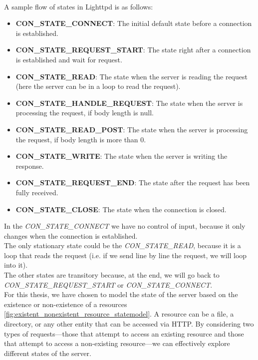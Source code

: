 \\A sample flow of states in Lighttpd is as follows:
\begin{itemize}
    \item \textbf{CON\_STATE\_CONNECT}: The initial default state before a connection is established.
    
    \item \textbf{CON\_STATE\_REQUEST\_START}: The state right after a connection is established and wait for request.
    
    \item \textbf{CON\_STATE\_READ}: The state when the server is reading the request (here the server can be in a loop to read the request).
    
    \item \textbf{CON\_STATE\_HANDLE\_REQUEST}: The state when the server is processing the request, if body length is null.
    
    \item \textbf{CON\_STATE\_READ\_POST}: The state when the server is processing the request, if body length is more than 0.
    
    \item \textbf{CON\_STATE\_WRITE}: The state when the server is writing the response.
    
    \item \textbf{CON\_STATE\_REQUEST\_END}: The state after the request has been fully received.
    
    \item \textbf{CON\_STATE\_CLOSE}: The state when the connection is closed.
\end{itemize}
In the \textit{CON\_STATE\_CONNECT} we have no control of input, because it only changes when the connection is established.
\\The only stationary state could be the \textit{CON\_STATE\_READ}, because it is a loop that reads the request (i.e. if we send line by line the request, we will loop into it).
\\The other states are transitory because, at the end, we will go back to \textit{CON\_STATE\_REQUEST\_START} or \textit{CON\_STATE\_CONNECT}.
\\For this thesis, we have chosen to model the state of the server based on the existence or non-existence of a resources \ref{fig:existent_nonexistent_resource_statemodel}. A resource can be a file, a directory, or any other entity that can be accessed via HTTP. By considering two types of requests—those that attempt to access an existing resource and those that attempt to access a non-existing resource—we can effectively explore different states of the server.
